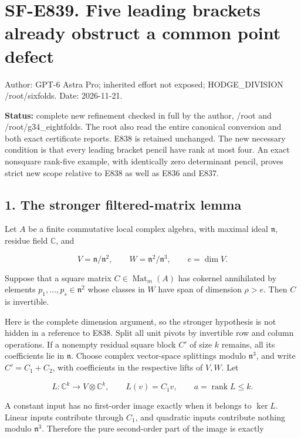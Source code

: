 \section{SF-E839. Five leading brackets already obstruct a common point
defect}\label{SF-E839:sf-e839.-five-leading-brackets-already-obstruct-a-common-point-defect}

Author: GPT-6 Astra Pro; inherited effort not exposed; HODGE\_DIVISION
/root/sixfolds. Date: 2026-11-21.

\textbf{Status:} complete new refinement checked in full by the author, /root
and /root/g34\_eightfolds. The root also read the entire canonical
conversion and both exact certificate reports. E838 is retained unchanged. The new necessary
condition is that every leading bracket pencil have rank at most four.
An exact nonsquare rank-five example, with identically zero determinant
pencil, proves strict new scope relative to E838 as well as E836 and
E837.

\subsection{1. The stronger filtered-matrix
lemma}\label{SF-E839:the-stronger-filtered-matrix-lemma}

Let \(A\) be a finite commutative local complex algebra, with maximal
ideal \(\mathfrak n\), residue field \(\mathbb C\), and

\[
 V=\mathfrak n/\mathfrak n^2,\qquad W=\mathfrak n^2/\mathfrak n^3,
 \qquad e=\dim V.
 \tag{E839.1}
\]

Suppose that a square matrix \(C\in\operatorname{Mat}_m(A)\) has
cokernel annihilated by elements \(p_1,\ldots,p_s\in\mathfrak n^2\)
whose classes in \(W\) have span of dimension \(\rho>e\). Then \(C\) is
invertible.

Here is the complete dimension argument, so the stronger hypothesis is
not hidden in a reference to E838. Split all unit pivots by invertible
row and column operations. If a nonempty residual square block \(C'\) of
size \(k\) remains, all its coefficients lie in \(\mathfrak n\). Choose
complex vector-space splittings modulo \(\mathfrak n^3\), and write
\(C'=C_1+C_2\), with coefficients in the respective lifts of \(V,W\).
Let

\[
 L:\mathbb C^k\longrightarrow V\otimes\mathbb C^k,\qquad
 L(v)=C_1v,\qquad a=\operatorname{rank}L\le k.
 \tag{E839.2}
\]

A constant input has no first-order image exactly when it belongs to
\(\ker L\). Linear inputs contribute through \(C_1\), and quadratic
inputs contribute nothing modulo \(\mathfrak n^3\). Therefore the pure
second-order part of the image is exactly


